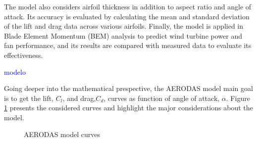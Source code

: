 The model also considers airfoil thickness in addition to aspect ratio and angle of attack. Its accuracy is evaluated by calculating the mean and standard deviation of the lift and drag data across various airfoils. Finally, the model is applied in Blade Element Momentum (BEM) analysis to predict wind turbine power and fan performance, and its results are compared with measured data to evaluate its effectiveness.

\textcolor{blue}{modelo}

Going deeper into the mathematical prespective, the AERODAS model main goal is to get the lift, $C_l$, and drag,$C_d$, curves as function of angle of attack, $\alpha$. Figure \ref{fig:aerodas_functions} presents the considered curves and highlight the major considerations about the model.

\begin{figure}[!htb]
    \centering
    \hfill
    \caption{AERODAS model curves}
    \label{fig:aerodas_functions}
\end{figure}

